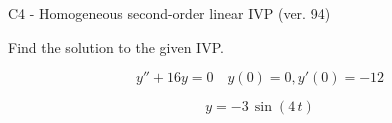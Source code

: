 \begin{exercise}
  \begin{exerciseTitle}C4 - Homogeneous second-order linear IVP (ver. 94)\end{exerciseTitle}
  \begin{exerciseStatement}
    
Find the solution to the given IVP.

    
\[y''+16y = 0 \hspace{1em} y(0) = 0 , y'(0) = -12\]

  \end{exerciseStatement}
  \begin{exerciseAnswer}
    
\[y= -3 \, \sin\left(4 \, t\right)\]

  \end{exerciseAnswer}
\end{exercise}